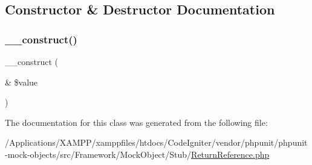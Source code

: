\subsection{Constructor \& Destructor Documentation}
\mbox{\label{class_p_h_p_unit___framework___mock_object___stub___return_reference_a7da53cf219c768e035e88ac932732fb8}} 
\subsubsection{\texorpdfstring{\+\_\+\+\_\+construct()}{\_\_construct()}}
{\footnotesize\ttfamily \+\_\+\+\_\+construct (\begin{DoxyParamCaption}\item[{\&}]{\$value }\end{DoxyParamCaption})}



The documentation for this class was generated from the following file\+:\begin{DoxyCompactItemize}
\item 
/\+Applications/\+X\+A\+M\+P\+P/xamppfiles/htdocs/\+Code\+Igniter/vendor/phpunit/phpunit-\/mock-\/objects/src/\+Framework/\+Mock\+Object/\+Stub/\mbox{\hyperlink{_return_reference_8php}{Return\+Reference.\+php}}\end{DoxyCompactItemize}
